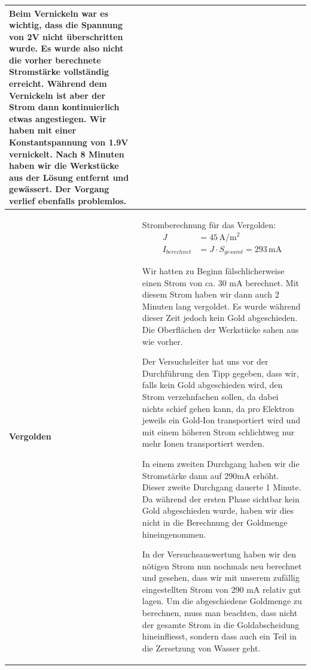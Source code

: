\begin{longtable}{p{3cm}p{14cm}}
    Beim Vernickeln war es wichtig, dass die Spannung von 2V nicht überschritten wurde. Es wurde also nicht die vorher berechnete Stromstärke vollständig erreicht. Während dem Vernickeln ist aber der Strom dann kontinuierlich etwas angestiegen. Wir haben mit einer Konstantspannung von 1.9V vernickelt. Nach 8 Minuten haben wir die Werkstücke aus der Lösung entfernt und gewässert. Der Vorgang verlief ebenfalls problemlos.\\
    \hline
    
    \textbf{Vergolden}
    & Stromberechnung für das Vergolden:
    $$\begin{aligned}
        J &= 45 \, \mathrm{A/m^2}\\
        I_{berechnet} &= J \cdot S_{gesamt} = 293 \, \mathrm{mA}
    \end{aligned}$$
    
    Wir hatten zu Beginn fälschlicherweise einen Strom von ca. 30 mA berechnet. Mit diesem Strom haben wir dann auch 2 Minuten lang vergoldet. Es wurde während dieser Zeit jedoch kein Gold abgeschieden. Die Oberflächen der Werkstücke sahen aus wie vorher.
    
    Der Versuchsleiter hat uns vor der Durchführung den Tipp gegeben, dass wir, falls kein Gold abgeschieden wird, den Strom verzehnfachen sollen, da dabei nichts schief gehen kann, da pro Elektron jeweils ein Gold-Ion transportiert wird und mit einem höheren Strom schlichtweg nur mehr Ionen transportiert werden.
    
    In einem zweiten Durchgang haben wir die Stromstärke dann auf 290mA erhöht. Dieser zweite Durchgang dauerte 1 Minute. Da während der ersten Phase sichtbar kein Gold abgeschieden wurde, haben wir dies nicht in die Berechnung der Goldmenge hineingenommen.
    
    In der Versuchsauswertung haben wir den nötigen Strom nun nochmals neu berechnet und gesehen, dass wir mit unserem zufällig eingestellten Strom von 290 mA relativ gut lagen.\newline
    Um die abgeschiedene Goldmenge zu berechnen, muss man beachten, dass nicht der gesamte Strom in die Goldabscheidung hineinfliesst, sondern dass auch ein Teil in die Zersetzung von Wasser geht.
\end{longtable}
\newpage

